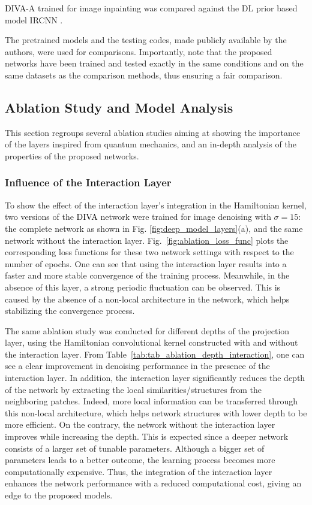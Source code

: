 \documentclass[10pt,journal,compsoc]{IEEEtran}
\newcommand{\dk}{\textcolor{black}}
\begin{document}
\dk{DIVA}-A trained for image inpainting was compared against the DL prior based model IRCNN \cite{Zhang2017learning}.


The pretrained models and the testing codes, made publicly available by the authors, were used for comparisons. Importantly, note that the proposed networks have been trained and tested exactly in the same conditions and on the same datasets as the comparison methods, thus ensuring a fair comparison.

\subsection{Ablation Study and Model Analysis}
\label{sec:ablation}

This section regroups several ablation studies aiming at showing the importance of the layers inspired from quantum mechanics, and an in-depth analysis of the properties of the proposed networks.

\subsubsection{Influence of the Interaction Layer}


To show the effect of the interaction layer's integration in the Hamiltonian kernel, two versions of the \dk{DIVA} network were trained for image denoising with $\sigma = 15$: the complete network as shown in Fig. \ref{fig:deep_model_layers}(a), and the same network without the interaction layer. Fig.~\ref{fig:ablation_loss_func} plots the corresponding loss functions for these two network settings with respect to the number of epochs. One can see that using the interaction layer results into a faster and more stable convergence of the training process. Meanwhile, in the absence of this layer, a strong periodic fluctuation can be observed. This is caused by the absence of a non-local architecture in the network, which helps stabilizing the convergence process.

The same ablation study was conducted for different depths of the projection layer, using the Hamiltonian convolutional kernel constructed with and without the interaction layer. From Table~\ref{tab:tab_ablation_depth_interaction}, one can see a clear improvement in denoising performance in the presence of the interaction layer. In addition, the interaction layer significantly reduces the depth of the network by extracting the local similarities/structures from the neighboring patches. Indeed, more local information can be transferred through this non-local architecture, which helps network structures with lower depth to be more efficient. On the contrary, the network without the interaction layer improves while increasing the depth. This is expected since a deeper network consists of a larger set of tunable parameters. Although a bigger set of parameters leads to a better outcome, the learning process becomes more computationally expensive. Thus, the integration of the interaction layer enhances the network performance with a reduced computational cost, giving an edge to the proposed models.
\end{document}

